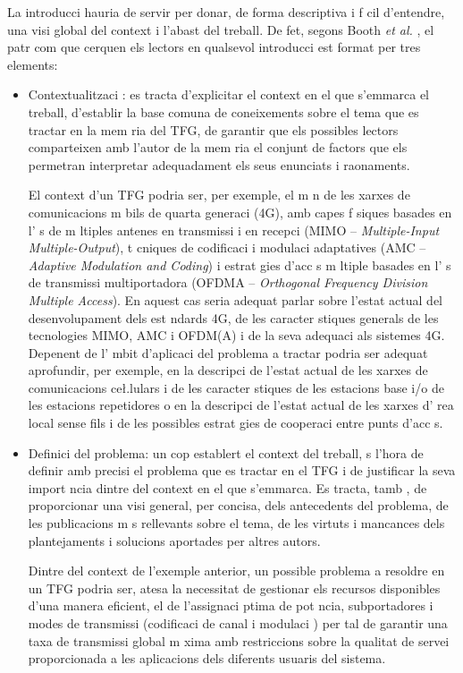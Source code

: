 La introducci  hauria de servir per donar, de forma descriptiva i f cil d'entendre, una visi  global del context i l'abast del treball. De fet, segons Booth \emph{et al.} \cite{Booth08}, el patr  com  que cerquen els lectors en qualsevol introducci  est  format per tres elements:
\begin{itemize}
   \item Contextualitzaci : es tracta d'explicitar el context en el que s'emmarca el treball, d'establir la base comuna de coneixements sobre el tema que es tractar  en la mem ria del TFG, de garantir que els possibles lectors comparteixen amb l'autor de la mem ria el conjunt de factors que els permetran interpretar adequadament els seus enunciats i raonaments.

       El context d'un TFG podria ser, per exemple, el m n de les xarxes de comunicacions m bils de quarta generaci  (4G), amb capes f siques basades en l' s de m ltiples antenes en transmissi  i en recepci  (MIMO -- \emph{Multiple-Input Multiple-Output}), t cniques de codificaci  i modulaci  adaptatives (AMC -- \emph{Adaptive Modulation and Coding}) i estrat gies d'acc s m ltiple basades en l' s de transmissi  multiportadora (OFDMA -- \emph{Orthogonal Frequency Division Multiple Access}). En aquest cas seria adequat parlar sobre l'estat actual del desenvolupament dels est ndards 4G, de les caracter stiques generals de les tecnologies MIMO, AMC i OFDM(A) i de la seva adequaci  als sistemes 4G. Depenent de l' mbit d'aplicaci  del problema a tractar podria ser adequat aprofundir, per exemple, en la descripci  de l'estat actual de les xarxes de comunicacions ce\l.lulars i de les caracter stiques de les estacions base i/o de les estacions repetidores o en la descripci  de l'estat actual de les xarxes d' rea local sense fils i de les possibles estrat gies de cooperaci  entre punts d'acc s.

   \item Definici  del problema: un cop establert el context del treball,  s l'hora de definir amb precisi  el problema que es tractar  en el TFG i de justificar la seva import ncia dintre del context en el que s'emmarca. Es tracta, tamb , de proporcionar una visi  general, per  concisa, dels antecedents del problema, de les publicacions m s rellevants sobre el tema, de les virtuts i mancances dels plantejaments i solucions aportades per altres autors.

       Dintre del context de l'exemple anterior, un possible problema a resoldre en un TFG podria ser, atesa la necessitat de gestionar els recursos disponibles d'una manera eficient, el de l'assignaci   ptima de pot ncia, subportadores i modes de transmissi  (codificaci  de canal i modulaci ) per tal de garantir una taxa de transmissi  global m xima amb restriccions sobre la qualitat de servei proporcionada a les aplicacions dels diferents usuaris del sistema.


\end{itemize}
